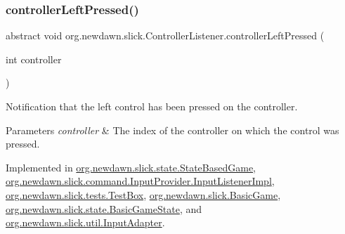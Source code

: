 \mbox{\label{interfaceorg_1_1newdawn_1_1slick_1_1_controller_listener_abfb38c5d8e44b7613a49cbfaf19d5585}} 
\subsubsection{\texorpdfstring{controller\+Left\+Pressed()}{controllerLeftPressed()}}
{\footnotesize\ttfamily abstract void org.\+newdawn.\+slick.\+Controller\+Listener.\+controller\+Left\+Pressed (\begin{DoxyParamCaption}\item[{int}]{controller }\end{DoxyParamCaption})\hspace{0.3cm}{\ttfamily [abstract]}}

Notification that the left control has been pressed on the controller.


\begin{DoxyParams}{Parameters}
{\em controller} & The index of the controller on which the control was pressed. \\
\hline
\end{DoxyParams}


Implemented in \mbox{\hyperlink{classorg_1_1newdawn_1_1slick_1_1state_1_1_state_based_game_a9bba4427977b841b78d8706910f0a8e7}{org.\+newdawn.\+slick.\+state.\+State\+Based\+Game}}, \mbox{\hyperlink{classorg_1_1newdawn_1_1slick_1_1command_1_1_input_provider_1_1_input_listener_impl_a63696617ddee4b5ae49ab7bd892d14ee}{org.\+newdawn.\+slick.\+command.\+Input\+Provider.\+Input\+Listener\+Impl}}, \mbox{\hyperlink{classorg_1_1newdawn_1_1slick_1_1tests_1_1_test_box_a42966953b420faab6ab9261daf38ef13}{org.\+newdawn.\+slick.\+tests.\+Test\+Box}}, \mbox{\hyperlink{classorg_1_1newdawn_1_1slick_1_1_basic_game_aef303720a5e704f28de381cd96f62467}{org.\+newdawn.\+slick.\+Basic\+Game}}, \mbox{\hyperlink{classorg_1_1newdawn_1_1slick_1_1state_1_1_basic_game_state_ae506f3ea09df308d00e6253ca85cffc4}{org.\+newdawn.\+slick.\+state.\+Basic\+Game\+State}}, and \mbox{\hyperlink{classorg_1_1newdawn_1_1slick_1_1util_1_1_input_adapter_ad588e2783005ae0ff252efbc282688cb}{org.\+newdawn.\+slick.\+util.\+Input\+Adapter}}.


